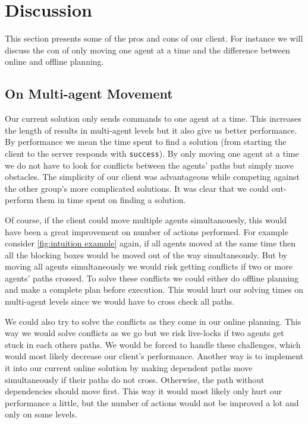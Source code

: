 \section{Discussion}
\label{sec:discussion}

This section presents some of the pros and cons of our client.
For instance we will discuss the con of only moving one agent at a time and the difference between online and offline planning.

\subsection{On Multi-agent Movement}
Our current solution only sends commands to one agent at a time.
This increases the length of results in multi-agent levels but it also give us better performance.
By performance we mean the time spent to find a solution (from starting the client to the server responds with \texttt{success}).
By only moving one agent at a time we do not have to look for conflicts between the agents' paths but simply move obstacles.
The simplicity of our client was advantageous while competing against the other group's more complicated solutions.
It was clear that we could out-perform them in time spent on finding a solution.

Of course, if the client could move multiple agents simultanouesly, this would have been a great improvement on number of actions performed.
For example consider \cref{fig:intuition example} again, if all agents moved at the same time then all the blocking boxes would be moved out of the way simultaneously.
But by moving all agents simultaneously we would risk getting conflicts if two or more agents' paths crossed.
To solve these conflicts we could either do offline planning and make a complete plan before execution.
This would hurt our solving times on multi-agent levels since we would have to cross check all paths.

We could also try to solve the conflicts as they come in our online planning.
This way we would solve conflicts as we go but we risk live-locks if two agents get stuck in each others paths.
We would be forced to handle these challenges, which would most likely decrease our client's performance.
Another way is to implement it into our current online solution by making dependent paths move simultaneously if their paths do not cross.
Otherwise, the path without dependencies should move first.
This way it would most likely only hurt our performance a little, but the number of actions would not be improved a lot and only on some levels.

